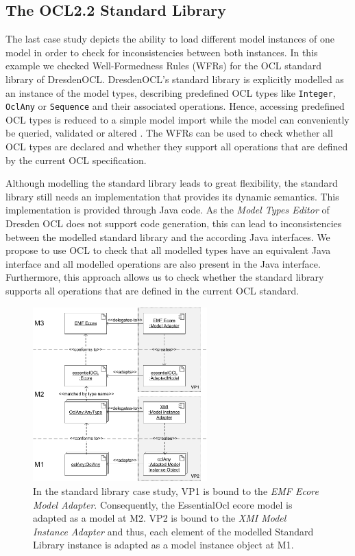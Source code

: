 \subsection{The OCL2.2 Standard Library}
The last case study depicts the ability to load different model instances of one model 
in order to check for inconsistencies between both instances. In this example we 
checked Well-Formedness Rules (WFRs) for the OCL standard library of DresdenOCL. 
DresdenOCL's standard library is explicitly modelled as 
an instance of the model types, describing predefined OCL types like \texttt{Integer}, 
\texttt{OclAny} or \texttt{Sequence} and their associated operations. 
Hence, accessing predefined OCL types is reduced to a simple model 
import while the model can conveniently be queried, validated or altered 
\cite{braeuerOCL07}. The WFRs can be used to check whether all OCL types are 
declared and whether they support all operations that are defined by the 
current OCL specification.

Although modelling the standard library leads to great flexibility, the standard library 
still needs an implementation that provides its dynamic semantics. 
This implementation is provided through Java code. As the \textit{Model Types Editor} of Dresden OCL
does not support code generation, this can lead to inconsistencies between 
the modelled standard library and the according Java interfaces.
We propose to use OCL to check that all modelled types have an equivalent Java 
interface and all modelled operations are also present in the Java interface. Furthermore, 
this approach allows us to check whether the standard library supports all operations that 
are defined in the current OCL standard.

\begin{figure}[!t]
	\centering
		\includegraphics[width=0.60\textwidth]{figures/casestudy03.pdf}
	\caption{ In the standard library case study, VP1 is bound to the \textit{EMF Ecore Model Adapter}. 
	  Consequently, the EssentialOcl ecore model is adapted as a model at M2.
	  VP2 is bound to the \textit{XMI Model Instance Adapter} and thus, each element of the modelled Standard Library
	  instance is adapted as a model instance object at M1.}
	\label{fig:casestudy03}
\end{figure}

